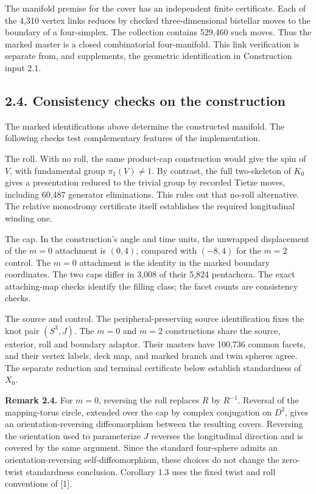 \documentclass[11pt,letterpaper]{article}
\begin{document}
The manifold premise for the cover has an independent finite certificate. Each of the 4,310 vertex links reduces by checked three-dimensional bistellar moves to the boundary of a four-simplex. The collection contains 529,460 such moves. Thus the marked master is a closed combinatorial four-manifold. This link verification is separate from, and supplements, the geometric identification in Construction input 2.1.

\subsection*{2.4. Consistency checks on the construction}
The marked identifications above determine the constructed manifold. The following checks test complementary features of the implementation.

The roll. With no roll, the same product-cap construction would give the spin of $V$, with fundamental group $\pi_1(V)\neq1$. By contrast, the full two-skeleton of $K_0$ gives a presentation reduced to the trivial group by recorded Tietze moves, including 60,487 generator eliminations. This rules out that no-roll alternative. The relative monodromy certificate itself establishes the required longitudinal winding one.

The cap. In the construction's angle and time units, the unwrapped displacement of the $m=0$ attachment is $(0,4)$, compared with $(-8,4)$ for the $m=2$ control. The $m=0$ attachment is the identity in the marked boundary coordinates. The two caps differ in 3,008 of their 5,824 pentachora. The exact attaching-map checks identify the filling class; the facet counts are consistency checks.

The source and control. The peripheral-preserving source identification fixes the knot pair $(S^3,J)$. The $m=0$ and $m=2$ constructions share the source, exterior, roll and boundary adaptor. Their masters have 100,736 common facets, and their vertex labels, deck map, and marked branch and twin spheres agree. The separate reduction and terminal certificate below establish standardness of $X_0$.

\medskip\noindent\textbf{Remark 2.4.} For $m=0$, reversing the roll replaces $R$ by $R^{-1}$. Reversal of the mapping-torus circle, extended over the cap by complex conjugation on $D^2$, gives an orientation-reversing diffeomorphism between the resulting covers. Reversing the orientation used to parameterize $J$ reverses the longitudinal direction and is covered by the same argument. Since the standard four-sphere admits an orientation-reversing self-diffeomorphism, these choices do not change the zero-twist standardness conclusion. Corollary 1.3 uses the fixed twist and roll conventions of [1].
\end{document}
